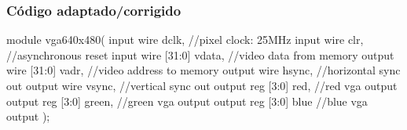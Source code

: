 
\begin{frame}[fragile]
	\frametitle{Código adaptado/corrigido}
	\begin{verilogcode}
module vga640x480(
  input wire dclk,           //pixel clock: 25MHz
  input wire clr,            //asynchronous reset
  input wire [31:0] vdata,   //video data from memory 
  output wire [31:0] vadr,   //video address to memory
  output wire hsync,         //horizontal sync out
  output wire vsync,         //vertical sync out
  output reg [3:0] red,      //red vga output
  output reg [3:0] green,    //green vga output
  output reg [3:0] blue      //blue vga output
  );
    \end{verilogcode} 
\end{frame}

